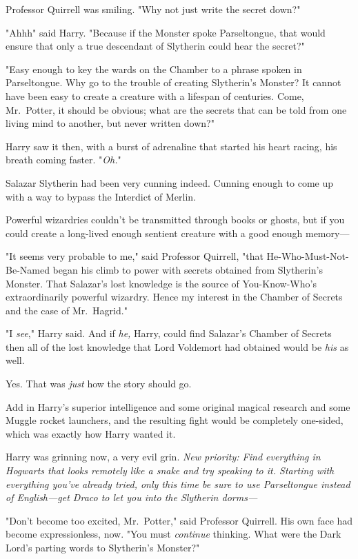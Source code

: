 Professor Quirrell was smiling. "Why not just write the secret down?"

"Ahhh{\el}" said Harry. "Because if the Monster spoke Parseltongue, that
would ensure that only a true descendant of Slytherin could hear the secret?"

"Easy enough to key the wards on the Chamber to a phrase spoken in
Parseltongue. Why go to the trouble of creating Slytherin's Monster? It cannot
have been easy to create a creature with a lifespan of centuries. Come,
Mr.~Potter, it should be obvious; what are the secrets that can be told from
one living mind to another, but never written down?"

Harry saw it then, with a burst of adrenaline that started his heart racing,
his breath coming faster. "\emph{Oh.}"

Salazar Slytherin had been very cunning indeed. Cunning enough to come up with
a way to bypass the Interdict of Merlin.

Powerful wizardries couldn't be transmitted through books or ghosts, but if you
could create a long-lived enough sentient creature with a good enough memory---

"It seems very probable to me," said Professor Quirrell, "that
He-Who-Must-Not-Be-Named began his climb to power with secrets obtained from
Slytherin's Monster. That Salazar's lost knowledge is the source of
You-Know-Who's extraordinarily powerful wizardry. Hence my interest in the
Chamber of Secrets and the case of Mr.~Hagrid."

"I \emph{see}," Harry said. And if \emph{he,} Harry, could find Salazar's
Chamber of Secrets{\el} then all of the lost knowledge that Lord Voldemort
had obtained would be \emph{his} as well.

Yes. That was \emph{just} how the story should go.

Add in Harry's superior intelligence and some original magical research and
some Muggle rocket launchers, and the resulting fight would be completely
one-sided, which was exactly how Harry wanted it.

Harry was grinning now, a very evil grin. \emph{New priority: Find everything
in Hogwarts that looks remotely like a snake and try speaking to it. Starting
with everything you've already tried, only this time be sure to use
Parseltongue instead of English---get Draco to let you into the Slytherin
dorms---}

"Don't become too excited, Mr.~Potter," said Professor Quirrell. His own face
had become expressionless, now. "You must \emph{continue} thinking. What were
the Dark Lord's parting words to Slytherin's Monster?"

